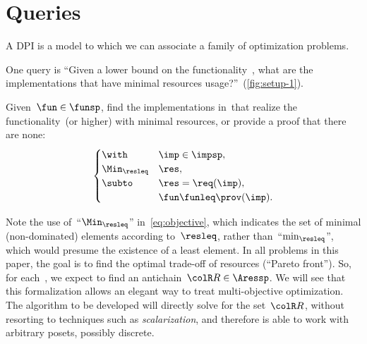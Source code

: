 

\section{Queries}
\label{sec:design-problems-querying}

A DPI is a model to which we can associate a family of optimization problems.


One query is ``Given a lower bound on the functionality~\fun, what are the implementations that have minimal resources usage?''~(\cref{fig:setup-1}).

\begin{problem}[\FixFunMinReq]
  \label{prob:FixFunMinReq}
  \label{prob:problem1}
  Given~$\fun\in\funsp$, find the implementations in~\impsp that realize the functionality~\fun (or higher) with minimal resources, or provide a proof that there are none:
  \begin{equation}
    \begin{cases}
      \with & \imp\in\impsp,\\
      \Min_{\resleq} & \res,\\
      \subto & \res=\req(\imp),\\
      & \fun\funleq\prov(\imp).
    \end{cases}\label{eq:objective}
  \end{equation}
\end{problem}



\begin{remark}
  Note the use of~``$\Min_{\resleq}$'' in~\cref{eq:objective},
  which indicates the set of minimal (non-dominated) elements according
  to~$\resleq$, rather than~``$\min_{\resleq}$'', which would
  presume the existence of a least element. In all problems in this
  paper, the goal is to find the optimal trade-off of resources (``Pareto
  front''). So, for each~\fun, we expect to find an antichain~${\colR R}\in\Aressp$.
  We will see that this formalization allows an elegant way to treat
  multi-objective optimization. The algorithm to be developed will directly
  solve for the set~${\colR R}$, without resorting to techniques such
  as \emph{scalarization}, and therefore is able to work with arbitrary
  posets, possibly discrete.
\end{remark}


